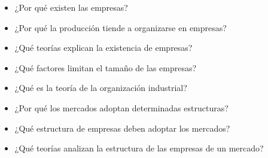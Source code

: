 \documentclass{nuevotema}
\begin{document}
\ideaclave



\begin{itemize}
	\item ¿Por qué existen las empresas?
	\item ¿Por qué la producción tiende a organizarse en empresas?
	\item ¿Qué teorías explican la existencia de empresas?
	\item ¿Qué factores limitan el tamaño de las empresas?
	\item ¿Qué es la teoría de la organización industrial?
	\item ¿Por qué los mercados adoptan determinadas estructuras?
	\item ¿Qué estructura de empresas deben adoptar los mercados?
	\item ¿Qué teorías analizan la estructura de las empresas de un mercado?
\end{itemize}

\esquemacorto
\end{document}
